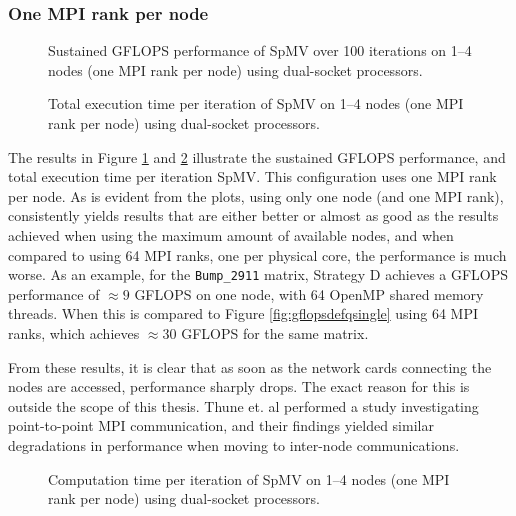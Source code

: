 \subsubsection{One MPI rank per node}
\begin{figure}[H]
    \centering
    \caption{Sustained GFLOPS performance of SpMV over 100 iterations on 1–4 nodes (one MPI rank per node) using dual-socket  processors.}
    \label{fig:gflopsdefqmulti}
\end{figure}
\medskip

\begin{figure}[H]
    \centering
    \caption{Total execution time per iteration of SpMV on 1–4 nodes (one MPI rank per node) using dual-socket  processors.}
    \label{fig:tdefqmulti}
\end{figure}


The results in Figure \ref{fig:gflopsdefqmulti} and \ref{fig:tdefqmulti} illustrate the sustained GFLOPS performance, and total execution time per iteration SpMV. This configuration uses one MPI rank per node. As is evident from the plots, using only one node (and one MPI rank), consistently yields results that are either better or almost as good as the results achieved when using the maximum amount of available nodes, and when compared to using 64 MPI ranks, one per physical core, the performance is much worse. As an example, for the \texttt{Bump\_2911} matrix, Strategy D achieves a GFLOPS performance of \(\approx 9\) GFLOPS on one node, with 64 OpenMP shared memory threads. When this is compared to Figure \ref{fig:gflopsdefqsingle} using 64 MPI ranks, which achieves \(\approx 30\) GFLOPS for the same matrix.
\medskip

From these results, it is clear that as soon as the network cards connecting the nodes are accessed, performance sharply drops. The exact reason for this is outside the scope of this thesis. Thune et. al \cite{10064025} performed a study investigating point-to-point MPI communication, and their findings yielded similar degradations in performance when moving to inter-node communications.

\begin{figure}[H]
    \centering
    \caption{Computation time per iteration of SpMV on 1–4 nodes (one MPI rank per node) using dual-socket  processors.}
    \label{fig:tcompdefqmulti}
\end{figure}

